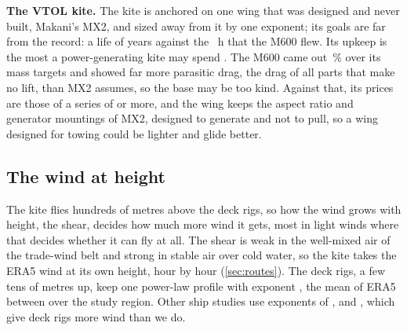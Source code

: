 \textbf{The VTOL kite.} The kite is anchored on one wing that was designed and never built, Makani's MX2, and sized away from it by one exponent; its goals are far from the record: a life of  years against the ~h that the M600 flew. Its upkeep is the most a power-generating kite may spend \citep{echeverri2020part1}. The M600 came out \,\% over its mass targets and showed far more parasitic drag, the drag of all parts that make no lift, than MX2 assumes, so the base may be too kind. Against that, its prices are those of a series of  or more, and the wing keeps the aspect ratio and generator mountings of MX2, designed to generate and not to pull, so a wing designed for towing could be lighter and glide better.

\subsection{The wind at height}
\label{sec:disc_profile}

The kite flies hundreds of metres above the deck rigs, so how the wind grows with height, the shear, decides how much more wind it gets, most in light winds where that decides whether it can fly at all. The shear is weak in the well-mixed air of the trade-wind belt and strong in stable air over cold water, so the kite takes the ERA5 wind at its own height, hour by hour (\cref{sec:routes}).  The deck rigs, a few tens of metres up, keep one power-law profile with exponent , the mean of ERA5 between  over the study region. Other ship studies use exponents of  \citep{rechevilanova2021},  \citep{penloup2021} and  \citep{tillig2020}, which give deck rigs more wind than we do.

